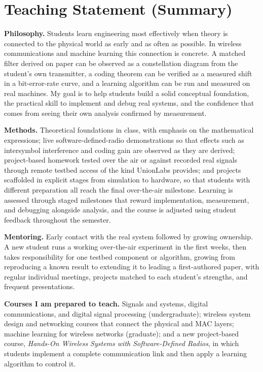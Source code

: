 \documentclass[10pt]{article}
\begin{document}
\section*{Teaching Statement (Summary)}
\textbf{Philosophy.} Students learn engineering most effectively when theory is connected to the physical world as early and as often as possible. In wireless communications and machine learning this connection is concrete. A matched filter derived on paper can be observed as a constellation diagram from the student's own transmitter, a coding theorem can be verified as a measured shift in a bit-error-rate curve, and a learning algorithm can be run and measured on real machines. My goal is to help students build a solid conceptual foundation, the practical skill to implement and debug real systems, and the confidence that comes from seeing their own analysis confirmed by measurement.

\textbf{Methods.} Theoretical foundations in class, with emphasis on the mathematical expressions; live software-defined-radio demonstrations so that effects such as intersymbol interference and coding gain are observed as they are derived; project-based homework tested over the air or against recorded real signals through remote testbed access of the kind UnionLabs provides; and projects scaffolded in explicit stages from simulation to hardware, so that students with different preparation all reach the final over-the-air milestone. Learning is assessed through staged milestones that reward implementation, measurement, and debugging alongside analysis, and the course is adjusted using student feedback throughout the semester.

\textbf{Mentoring.} Early contact with the real system followed by growing ownership. A new student runs a working over-the-air experiment in the first weeks, then takes responsibility for one testbed component or algorithm, growing from reproducing a known result to extending it to leading a first-authored paper, with regular individual meetings, projects matched to each student's strengths, and frequent presentations.

\textbf{Courses I am prepared to teach.} Signals and systems, digital communications, and digital signal processing (undergraduate); wireless system design and networking courses that connect the physical and MAC layers; machine learning for wireless networks (graduate); and a new project-based course, \emph{Hands-On Wireless Systems with Software-Defined Radios}, in which students implement a complete communication link and then apply a learning algorithm to control it.
\end{document}
